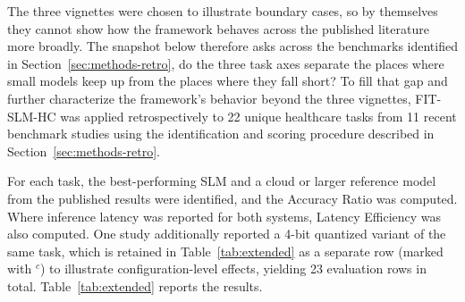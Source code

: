 \documentclass[11pt]{article}
\begin{document}
The three vignettes were chosen to illustrate boundary cases, so by themselves they cannot show how the framework behaves across the published literature more broadly. The snapshot below therefore asks across the benchmarks identified in Section~\ref{sec:methods-retro}, do the three task axes separate the places where small models keep up from the places where they fall short? To fill that gap and further characterize the framework's behavior beyond the three vignettes, FIT-SLM-HC was applied retrospectively to 22 unique healthcare tasks from 11 recent benchmark studies using the identification and scoring procedure described in Section~\ref{sec:methods-retro}.

For each task, the best-performing SLM and a cloud or larger reference model from the published results were identified, and the Accuracy Ratio was computed. Where inference latency was reported for both systems, Latency Efficiency was also computed. One study \cite{Grothey2025} additionally reported a 4-bit quantized variant of the same task, which is retained in Table~\ref{tab:extended} as a separate row (marked with $^c$) to illustrate configuration-level effects, yielding 23 evaluation rows in total. Table~\ref{tab:extended} reports the results.
\end{document}
